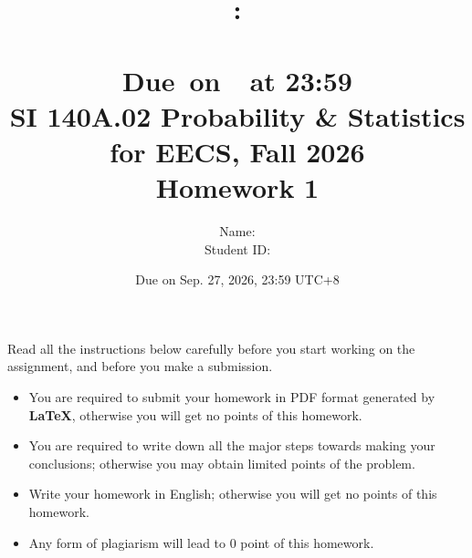 \documentclass[a4paper]{article}
\title{
    \vspace{2in}
    \textmd{\textbf{\hmwkClass:\\  \hmwkTitle}}\\
    \normalsize\vspace{0.1in}\small{Due\ on\ \hmwkDueDate\ at 23:59}\\
	\vspace{4in}
}
\author{
	Name: \textbf{\hmwkAuthorName} \\
	Student ID: \hmwkAuthorID}
\date{}
\begin{document}

\date{
Due on Sep. 27, 2026, 23:59 UTC+8}
\title{SI 140A.02  Probability \& Statistics for EECS, Fall 2026 \\
Homework 1}
\maketitle
Read all the instructions below carefully before you start working on the assignment, and before you make a submission.
\begin{itemize}
    \item You are required to submit your homework in PDF format generated by \textbf{LaTeX}, otherwise you will get no points of this homework.
    \item You are required to write down all the major steps towards making your conclusions; otherwise you may obtain limited points of the problem.
    \item Write your homework in English; otherwise you will get no points of this homework.
    \item Any form of plagiarism will lead to $0$ point of this homework. 
\end{itemize}
\newpage
\end{document}
